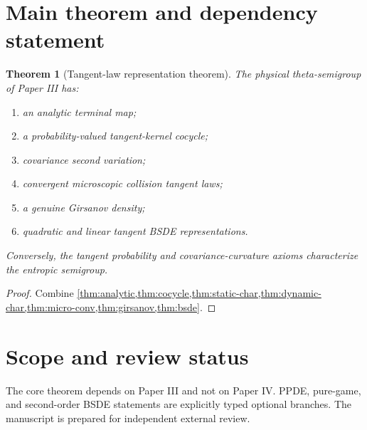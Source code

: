 \documentclass[11pt,reqno]{amsart}
\newtheorem{theorem}{Theorem}[section]
\theoremstyle{definition}
\theoremstyle{remark}
\begin{document}
\section{Main theorem and dependency statement}

\begin{theorem}[Tangent-law representation theorem]\label{thm:main}
The physical theta-semigroup of Paper III has:
\begin{enumerate}[label=(\roman*)]
\item an analytic terminal map;
\item a probability-valued tangent-kernel cocycle;
\item covariance second variation;
\item convergent microscopic collision tangent laws;
\item a genuine Girsanov density;
\item quadratic and linear tangent BSDE representations.
\end{enumerate}
Conversely, the tangent probability and covariance-curvature axioms
characterize the entropic semigroup.
\end{theorem}

\begin{proof}
Combine \cref{thm:analytic,thm:cocycle,thm:static-char,thm:dynamic-char,thm:micro-conv,thm:girsanov,thm:bsde}.
\end{proof}

\section*{Scope and review status}

The core theorem depends on Paper III and not on Paper IV.  PPDE, pure-game,
and second-order BSDE statements are explicitly typed optional branches.  The
manuscript is prepared for independent external review.



\end{document}
